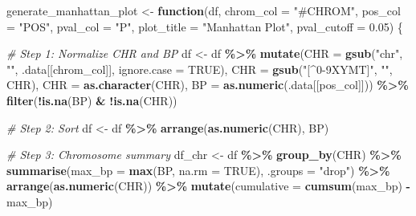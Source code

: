 \documentclass[
  12pt,
]{article}
\newenvironment{Shaded}{\begin{snugshade}}{\end{snugshade}}
\newcommand{\AttributeTok}[1]{\textcolor[rgb]{0.13,0.29,0.53}{#1}}
\newcommand{\CommentTok}[1]{\textcolor[rgb]{0.56,0.35,0.01}{\textit{#1}}}
\newcommand{\ConstantTok}[1]{\textcolor[rgb]{0.56,0.35,0.01}{#1}}
\newcommand{\ControlFlowTok}[1]{\textcolor[rgb]{0.13,0.29,0.53}{\textbf{#1}}}
\newcommand{\FloatTok}[1]{\textcolor[rgb]{0.00,0.00,0.81}{#1}}
\newcommand{\FunctionTok}[1]{\textcolor[rgb]{0.13,0.29,0.53}{\textbf{#1}}}
\newcommand{\NormalTok}[1]{#1}
\newcommand{\OtherTok}[1]{\textcolor[rgb]{0.56,0.35,0.01}{#1}}
\newcommand{\SpecialCharTok}[1]{\textcolor[rgb]{0.81,0.36,0.00}{\textbf{#1}}}
\newcommand{\StringTok}[1]{\textcolor[rgb]{0.31,0.60,0.02}{#1}}
\begin{document}
\begin{Shaded}
\begin{Highlighting}[]
\NormalTok{generate\_manhattan\_plot }\OtherTok{\textless{}{-}} \ControlFlowTok{function}\NormalTok{(df, }
                                    \AttributeTok{chrom\_col =} \StringTok{"\#CHROM"}\NormalTok{, }
                                    \AttributeTok{pos\_col =} \StringTok{"POS"}\NormalTok{, }
                                    \AttributeTok{pval\_col =} \StringTok{"P"}\NormalTok{, }
                                    \AttributeTok{plot\_title =} \StringTok{"Manhattan Plot"}\NormalTok{, }
                                    \AttributeTok{pval\_cutoff =} \FloatTok{0.05}\NormalTok{) \{}

  \CommentTok{\# Step 1: Normalize CHR and BP}
\NormalTok{  df }\OtherTok{\textless{}{-}}\NormalTok{ df }\SpecialCharTok{\%\textgreater{}\%}
    \FunctionTok{mutate}\NormalTok{(}\AttributeTok{CHR =} \FunctionTok{gsub}\NormalTok{(}\StringTok{"chr"}\NormalTok{, }\StringTok{""}\NormalTok{, .data[[chrom\_col]], }\AttributeTok{ignore.case =} \ConstantTok{TRUE}\NormalTok{),}
           \AttributeTok{CHR =} \FunctionTok{gsub}\NormalTok{(}\StringTok{"[\^{}0{-}9XYMT]"}\NormalTok{, }\StringTok{""}\NormalTok{, CHR),}
           \AttributeTok{CHR =} \FunctionTok{as.character}\NormalTok{(CHR),}
           \AttributeTok{BP =} \FunctionTok{as.numeric}\NormalTok{(.data[[pos\_col]])) }\SpecialCharTok{\%\textgreater{}\%}
    \FunctionTok{filter}\NormalTok{(}\SpecialCharTok{!}\FunctionTok{is.na}\NormalTok{(BP) }\SpecialCharTok{\&} \SpecialCharTok{!}\FunctionTok{is.na}\NormalTok{(CHR))}

  \CommentTok{\# Step 2: Sort}
\NormalTok{  df }\OtherTok{\textless{}{-}}\NormalTok{ df }\SpecialCharTok{\%\textgreater{}\%} \FunctionTok{arrange}\NormalTok{(}\FunctionTok{as.numeric}\NormalTok{(CHR), BP)}

  \CommentTok{\# Step 3: Chromosome summary}
\NormalTok{  df\_chr }\OtherTok{\textless{}{-}}\NormalTok{ df }\SpecialCharTok{\%\textgreater{}\%}
    \FunctionTok{group\_by}\NormalTok{(CHR) }\SpecialCharTok{\%\textgreater{}\%}
    \FunctionTok{summarise}\NormalTok{(}\AttributeTok{max\_bp =} \FunctionTok{max}\NormalTok{(BP, }\AttributeTok{na.rm =} \ConstantTok{TRUE}\NormalTok{), }\AttributeTok{.groups =} \StringTok{"drop"}\NormalTok{) }\SpecialCharTok{\%\textgreater{}\%}
    \FunctionTok{arrange}\NormalTok{(}\FunctionTok{as.numeric}\NormalTok{(CHR)) }\SpecialCharTok{\%\textgreater{}\%}
    \FunctionTok{mutate}\NormalTok{(}\AttributeTok{cumulative =} \FunctionTok{cumsum}\NormalTok{(max\_bp) }\SpecialCharTok{{-}}\NormalTok{ max\_bp)}


\end{Highlighting}
\end{Shaded}
\end{document}
